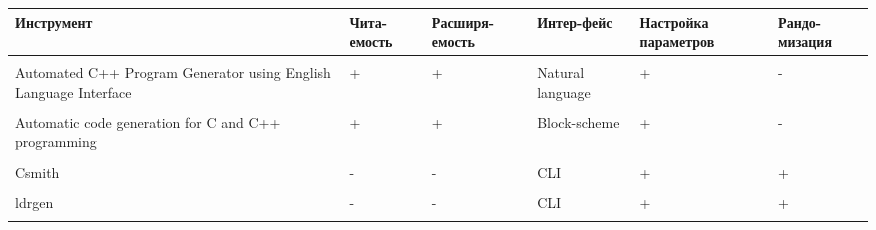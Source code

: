 \begin{table}[ht]
\begin{threeparttable}[t]
\begin{tabular}{p{5.1em}|m{4em}m{5em}m{4em}m{4em}m{4em}}
    Инструмент                                                       & Чита-\newline емость & Расширя-\newline емость & Интер-\newline фейс & Настройка параметров & Рандо-\newline мизация \\
    \hline                                                                                                                                                                                  \\
    Automated C++ Program Generator using English Language Interface & +                    & +                       & Natural language    & +                    & -                      \\
    \hline                                                                                                                                                                                  \\
    Automatic code generation for C and C++ programming              & +                    & +                       & Block-scheme        & +                    & -                      \\
    \hline                                                                                                                                                                                  \\
    Csmith                                                           & -                    & -                       & CLI\tnote{1}                 & +                    & +                      \\
    \hline                                                                                                                                                                                  \\
    ldrgen                                                           & -                    & -                       & CLI                 & +                    & +                      \\
    \hline                                                                                                                                                                                  \\

\end{tabular}
\end{threeparttable}
\end{table}
